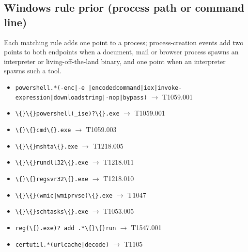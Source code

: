 \subsection{Windows rule prior (process path or command line)}
Each matching rule adds one point to a process; process-creation events add two points to both endpoints when a
document, mail or browser process spawns an interpreter or living-off-the-land binary, and one point when an
interpreter spawns such a tool.
\begin{itemize}\footnotesize
\item \texttt{powershell.\allowbreak{}*\allowbreak{}(\allowbreak{}-\allowbreak{}enc|\allowbreak{}-\allowbreak{}e |\allowbreak{}encodedcommand|\allowbreak{}iex|\allowbreak{}invoke-\allowbreak{}expression|\allowbreak{}downloadstring|\allowbreak{}-\allowbreak{}nop|\allowbreak{}bypass)\allowbreak{}} $\rightarrow$ T1059.\allowbreak{}001
\item \texttt{\textbackslash\{\}\textbackslash\{\}powershell(\allowbreak{}\_ise)\allowbreak{}?\allowbreak{}\textbackslash\{\}.\allowbreak{}exe} $\rightarrow$ T1059.\allowbreak{}001
\item \texttt{\textbackslash\{\}\textbackslash\{\}cmd\textbackslash\{\}.\allowbreak{}exe} $\rightarrow$ T1059.\allowbreak{}003
\item \texttt{\textbackslash\{\}\textbackslash\{\}mshta\textbackslash\{\}.\allowbreak{}exe} $\rightarrow$ T1218.\allowbreak{}005
\item \texttt{\textbackslash\{\}\textbackslash\{\}rundll32\textbackslash\{\}.\allowbreak{}exe} $\rightarrow$ T1218.\allowbreak{}011
\item \texttt{\textbackslash\{\}\textbackslash\{\}regsvr32\textbackslash\{\}.\allowbreak{}exe} $\rightarrow$ T1218.\allowbreak{}010
\item \texttt{\textbackslash\{\}\textbackslash\{\}(\allowbreak{}wmic|\allowbreak{}wmiprvse)\allowbreak{}\textbackslash\{\}.\allowbreak{}exe} $\rightarrow$ T1047
\item \texttt{\textbackslash\{\}\textbackslash\{\}schtasks\textbackslash\{\}.\allowbreak{}exe} $\rightarrow$ T1053.\allowbreak{}005
\item \texttt{reg(\allowbreak{}\textbackslash\{\}.\allowbreak{}exe)\allowbreak{}?\allowbreak{} add .\allowbreak{}*\allowbreak{}\textbackslash\{\}\textbackslash\{\}run} $\rightarrow$ T1547.\allowbreak{}001
\item \texttt{certutil.\allowbreak{}*\allowbreak{}(\allowbreak{}urlcache|\allowbreak{}decode)\allowbreak{}} $\rightarrow$ T1105

\end{itemize}
